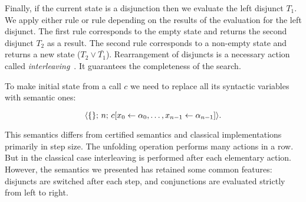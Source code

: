 Finally, if the current state is a disjunction then we evaluate the left disjunct $T_1$. We apply either rule  or rule  depending
on the results of the evaluation for the left disjunct. The first rule corresponds to the empty state and returns the second disjunct $T_2$ as a result. The second rule corresponds
to a non-empty state and returns a new state ($T_2 \lor \bar{T_1}$). Rearrangement of disjuncts is a necessary action called \emph{interleaving}~\cite{fair:interleaving}.
It guarantees the completeness of the search.

To make initial state from a call $c$ we need to replace all its syntactic variables with semantic ones:

\[
\langle \{\};\, n;\, c[x_0 \leftarrow \alpha_0, \ldots, x_{n-1} \leftarrow \alpha_{n-1}] \rangle.
\]

This semantics differs from certified semantics and classical implementations primarily in step size. The unfolding operation performs many actions in a row.
But in the classical case interleaving is performed after each elementary action. However, the semantics we presented has retained some common features: disjuncts are switched after each step, and conjunctions are evaluated strictly from left to right. 


